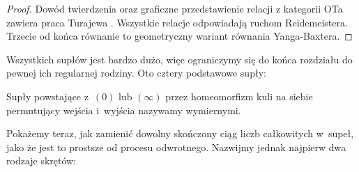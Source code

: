 \begin{proof}
    Dowód twierdzenia oraz graficzne przedstawienie relacji z kategorii OTa zawiera praca Turajewa \cite{turaev90}.
    Wszystkie relacje odpowiadają ruchom Reidemeistera.
%
    Trzecie od końca równanie to geometryczny wariant równania Yanga-Baxtera.
%
\end{proof}

Wszystkich supłów jest bardzo dużo, więc ograniczymy się do końca rozdziału do pewnej ich regularnej rodziny.
Oto cztery podstawowe supły:
\begin{comment}
\begin{figure}[H]
    \centering
    \begin{minipage}[b]{.23\linewidth}
        \[
            \LargeTangleBasicZero
        \]
        \subcaption{$(0)$}
    \end{minipage}
    \begin{minipage}[b]{.23\linewidth}
        \[
            \LargeTangleBasicInfinity
        \]
        \subcaption{$(\infty) = (0, 0)$}
    \end{minipage}
    \begin{minipage}[b]{.23\linewidth}
        \[
            \LargeTangleBasicMinus
        \]
        \subcaption{$(-1)$}
    \end{minipage}
    \begin{minipage}[b]{.23\linewidth}
        \[
            \LargeTangleBasicPlus
        \]
        \subcaption{$(+1)$}
    \end{minipage}
\end{figure}
\end{comment}

\begin{definition}
    Supły powstające z~$(0)$ lub $(\infty)$ przez homeomorfizm kuli na siebie permutujący wejścia i~wyjścia nazywamy wymiernymi.
\end{definition}

Pokażemy teraz, jak zamienić dowolny skończony ciąg liczb całkowitych w~supeł, jako że jest to prostsze od procesu odwrotnego.
Nazwijmy jednak najpierw dwa rodzaje skrętów:
\begin{comment}
\begin{figure}[H]
    \centering
    \begin{minipage}[b]{.48\linewidth}
        \[\LargeTwistsRight\]
        \subcaption{skręty prawe}
    \end{minipage}
    \begin{minipage}[b]{.48\linewidth}
        \centering
        \[\LargeTwistsLeft\]
        \subcaption{skręty lewe}
    \end{minipage}
\end{figure}
\end{comment}

